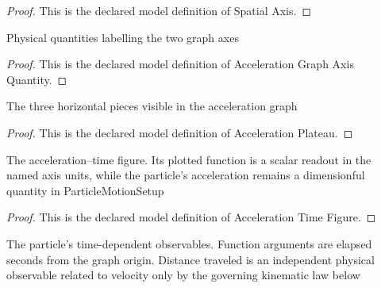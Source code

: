\begin{proof}
  This is the declared model definition of Spatial Axis.
\end{proof}
\begin{definition}
  \label{def:physics:phyx-mini-0670:phyxminiproblems-problemphyxmini0670-accelerationgraphaxisquantity}
  Physical quantities labelling the two graph axes
\end{definition}
\begin{proof}
  This is the declared model definition of Acceleration Graph Axis Quantity.
\end{proof}
\begin{definition}
  \label{def:physics:phyx-mini-0670:phyxminiproblems-problemphyxmini0670-accelerationplateau}
  The three horizontal pieces visible in the acceleration graph
\end{definition}
\begin{proof}
  This is the declared model definition of Acceleration Plateau.
\end{proof}
\begin{definition}
  \label{def:physics:phyx-mini-0670:phyxminiproblems-problemphyxmini0670-accelerationtimefigure}
  The acceleration--time figure. Its plotted function is a scalar readout in the named axis units, while the particle's acceleration remains a dimensionful quantity in ParticleMotionSetup
\end{definition}
\begin{proof}
  This is the declared model definition of Acceleration Time Figure.
\end{proof}
\begin{definition}
  \label{def:physics:phyx-mini-0670:phyxminiproblems-problemphyxmini0670-particlemotionsetup}
  The particle's time-dependent observables. Function arguments are elapsed seconds from the graph origin. Distance traveled is an independent physical observable related to velocity only by the governing kinematic law below
\end{definition}
